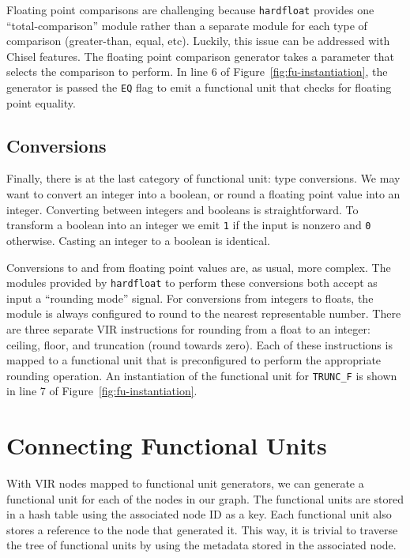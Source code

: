 \documentclass[sigconf, nonacm]{acmart}
\begin{document}
Floating point comparisons are challenging because \texttt{hardfloat} provides one ``total-comparison'' module rather than a separate module for each type of comparison (greater-than, equal, etc).
Luckily, this issue can be addressed with Chisel features.
The floating point comparison generator takes a parameter that selects the comparison to perform.
In line 6 of Figure~\ref{fig:fu-instantiation}, the generator is passed the \texttt{EQ} flag to emit a functional unit that checks for floating point equality.

\subsection{Conversions}

Finally, there is at the last category of functional unit: type conversions.
We may want to convert an integer into a boolean, or round a floating point value into an integer.
Converting between integers and booleans is straightforward.
To transform a boolean into an integer we emit \texttt{1} if the input is nonzero and \texttt{0} otherwise.
Casting an integer to a boolean is identical.

Conversions to and from floating point values are, as usual, more complex.
The modules provided by \texttt{hardfloat} to perform these conversions both accept as input a ``rounding mode'' signal.
For conversions from integers to floats, the module is always configured to round to the nearest representable number.
There are three separate VIR instructions for rounding from a float to an integer: ceiling, floor, and truncation (round towards zero).
Each of these instructions is mapped to a functional unit that is preconfigured to perform the appropriate rounding operation. An instantiation of the functional unit for \texttt{TRUNC\_F} is shown in line 7 of Figure~\ref{fig:fu-instantiation}.


\section{Connecting Functional Units}

With VIR nodes mapped to functional unit generators, we can generate a functional unit for each of the nodes in our graph.
The functional units are stored in a hash table using the associated node ID as a key.
Each functional unit also stores a reference to the node that generated it.
This way, it is trivial to traverse the tree of functional units by using the metadata stored in the associated node.
\end{document}
